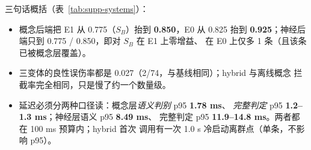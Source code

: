 \documentclass[11pt,a4paper]{article}
\begin{document}
\begin{table}[t]
\centering
\small
\caption{五系统在 E1/E0 与 74 条良性语料上的结果。k/n 为拦截条数/集合条数；
p95 为\emph{完整判定}（词法各级 + 语义通道）的 p95 延迟（ms）；括号内为语义阈值。
若把 E1 中两条良性创作从分母剔除（$n=38$），E1 比率为 0.395（A）、0.816（B）、
0.895（C-offline）、0.816（C-neural）、0.895（C-hybrid）。全部数值读自三份
冻结 run JSON，没有手填。}
\label{tab:supp-systems}
\end{table}

三句话概括（表~\ref{tab:supp-systems}）：
\begin{itemize}
  \item 概念后端把 E1 从 0.775（$S_B$）抬到 \textbf{0.850}，E0 从 0.825 抬到
    \textbf{0.925}；神经后端只到 0.775 / 0.850，即对 $S_B$ 在 E1 上零增益、
    在 E0 上仅多 1 条（且该条已被概念层覆盖）。
  \item 三变体的良性误伤率都是 0.027（2/74，与基线相同）；hybrid 与离线概念
    拦截率完全相同，只是慢了约一个数量级。
  \item 延迟必须分两种口径读：概念层\emph{语义判别} p95 \textbf{1.78 ms}、
    \emph{完整判定} p95 \textbf{1.2--1.3 ms}；神经层语义 p95 \textbf{8.49 ms}、
    完整判定 p95 \textbf{11.9--14.8 ms}。两者都在 100 ms 预算内；hybrid 首次
    调用有一次 1.0 s 冷启动离群点（单条，不影响 p95）。
\end{itemize}
\end{document}
